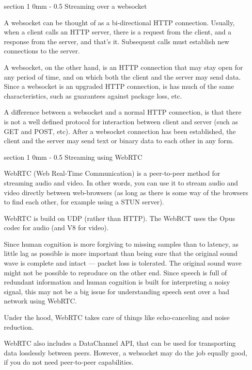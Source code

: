 \documentclass[11pt, a4paper, twoside]{article}
\makeatletter
\renewcommand{\section}{\@startsection
   {section}%
   {1}%
   {0mm}%
   {-\baselineskip}%
   {0.5\baselineskip}%
   {\bfseries\sffamily\Large}}%
\makeatother
\begin{document}
\section{Streaming over a websocket}

A websocket can be thought of as a bi-directional HTTP
connection. Usually, when a client calls an HTTP server, there is a
request from the client, and a response from the server, and that's
it. Subsequent calls must establish new connections to the server.

A websocket, on the other hand, is an HTTP connection that may stay
open for any period of time, and on which both the client and the
server may send data. Since a websocket is an upgraded HTTP
connection, is has much of the same characteristics, such as
guarantees against package loss, etc.

A difference between a websocket and a normal HTTP connection, is that
there is not a well defined protocol for interaction between client
and server (such as GET and POST, etc). After a websocket connection
has been established, the client and the server may send text or
binary data to each other in any form.


\section{Streaming using WebRTC}

WebRTC (Web Real-Time Communication) is a peer-to-peer method for
streaming audio and video. In other words, you can use it to stream
audio and video directly between web-browsers (as long as there is
some way of the browsers to find each other, for example using a STUN
server).

WebRTC is build on UDP (rather than HTTP). The WebRCT uses the Opus
codec for audio (and V8 for video).

Since human cognition is more forgiving to missing samples than to
latency, as little lag as possible is more important than being sure
that the original sound wave is complete and intact --- packet loss is
tolerated. The original sound wave might not be possible to reproduce
on the other end. Since speech is full of redundant information and
human cognition is built for interpreting a noisy signal, this may not
be a big issue for understanding speech sent over a bad network using
WebRTC.

Under the hood, WebRTC takes care of things like echo-canceling and
noise reduction. 


WebRTC also includes a DataChannel API, that can be used for
transporting data losslessly between peers. However, a websocket may
do the job equally good, if you do not need peer-to-peer capabilities.
\end{document}
